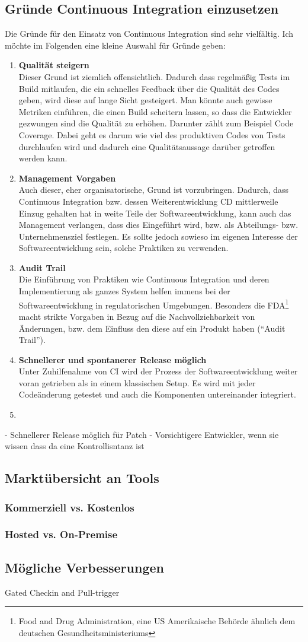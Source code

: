 \subsection{Gründe Continuous Integration einzusetzen}
Die Gründe für den Einsatz von Continuous Integration sind sehr vielfältig. Ich möchte im Folgenden eine kleine Auswahl für Gründe geben:
\begin{enumerate}
	\item \textbf{Qualität steigern}\\
	Dieser Grund ist ziemlich offensichtlich. Dadurch dass regelmäßig Tests im Build mitlaufen, die ein schnelles Feedback über die Qualität des Codes geben, wird diese auf lange Sicht gesteigert. Man könnte auch gewisse Metriken einführen, die einen Build scheitern lassen, so dass die Entwickler gezwungen sind die Qualität zu erhöhen. Darunter zählt zum Beispiel Code Coverage. Dabei geht es darum wie viel des produktiven Codes von Tests durchlaufen wird und dadurch eine Qualitätsaussage darüber getroffen werden kann.
	\item \textbf{Management Vorgaben}\\
	Auch dieser, eher organisatorische, Grund ist vorzubringen. Dadurch, dass Continuous Integration bzw. dessen Weiterentwicklung CD mittlerweile Einzug gehalten hat in weite Teile der Softwareentwicklung, kann auch das Management verlangen, dass dies Eingeführt wird, bzw. als Abteilungs- bzw. Unternehmensziel festlegen. Es sollte jedoch sowieso im eigenen Interesse der Softwareentwicklung sein, solche Praktiken zu verwenden.
	\item \textbf{Audit Trail}\\
	Die Einführung von Praktiken wie Continuous Integration und deren Implementierung als ganzes System helfen immens bei der Softwareentwicklung in regulatorischen Umgebungen. Besonders die FDA\footnote{Food and Drug Administration, eine US Amerikaische Behörde ähnlich dem deutschen Gesundheitsministeriums} macht strikte Vorgaben in Bezug auf die Nachvollziehbarkeit von Änderungen, bzw. dem Einfluss den diese auf ein Produkt haben ("`Audit Trail"').
	\item \textbf{Schnellerer und spontanerer Release möglich}\\
	Unter Zuhilfenahme von CI wird der Prozess der Softwareentwicklung weiter voran getrieben als in einem klassischen Setup. Es wird mit jeder Codeänderung getestet und auch die Komponenten untereinander integriert.
	\item \textbf{}
\end{enumerate} 
- Schnellerer Release möglich für Patch
- Vorsichtigere Entwickler, wenn sie wissen dass da eine Kontrollisntanz ist
\subsection{Marktübersicht an Tools}
\subsubsection{Kommerziell vs. Kostenlos}
\subsubsection{Hosted vs. On-Premise}
\subsection{Mögliche Verbesserungen}
Gated Checkin and Pull-trigger